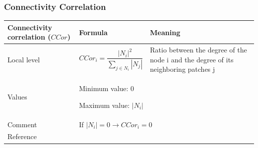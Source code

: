 \documentclass{article}
\begin{document}
\subsubsection{Connectivity Correlation}
\label{metric_CCor}
\begin{table}[H]
\begin{tabular}{|m{3.24cm}|m{4.4810004cm}m{7.924cm}|}
\hline
Connectivity correlation ($CCor$) &
\multicolumn{1}{m{4.4810004cm}|}{Formula} &
Meaning\\\hline
Local level

 &
\multicolumn{1}{m{4.4810004cm}|}{\begin{equation*}
{\mathit{CCor}}_{i}=\frac{{\left|{N}_{i}\right|}^{2}}{\sum
_{j{\in}{N}_{i}}{\left|{N}_{j}\right|}}
\end{equation*}
} &
Ratio between the degree of the node i and the degree of its neighboring
patches j\\\hline
Values &
\multicolumn{2}{m{12.6050005cm}|}{Minimum value: 0

Maximum value:  $\left|{N}_{i}\right|$

}\\\hline
Comment &
\multicolumn{2}{m{12.6050005cm}|}{If $\left|{N}_{i}\right|=0\rightarrow
{\mathit{CCor}}_{i}=0$}\\\hline
Reference &
\multicolumn{2}{m{12.6050005cm}|}{\cite{Minor2008}}\\\hline
\end{tabular}
\end{table}

\pagebreak



\end{document}
